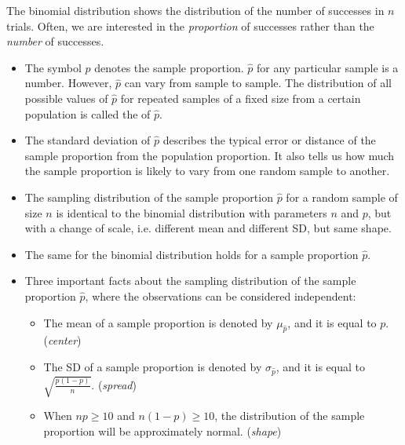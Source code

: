 \noindent The binomial distribution shows the distribution of the number of successes in $n$ trials.  Often, we are interested in the \textit{proportion} of successes rather than the \textit{number} of successes.
\begin{itemize}

\item The symbol $\hat{p}$ denotes the sample proportion.  $\hat{p}$ for any particular sample is a number.  However, $\hat{p}$ can vary from sample to sample.  The distribution of all possible values of $\hat{p}$ for repeated samples of a fixed size from a certain population is called the  of $\hat{p}$.

\item The standard deviation of $\hat{p}$ describes the typical error or distance of the sample proportion from the population proportion.  It also tells us how much the sample proportion is likely to vary from one random sample to another.  

\item The sampling distribution of the sample proportion $\hat{p}$ for a random sample of size $n$ is identical to the binomial distribution with parameters $n$ and $p$, but with a change of scale, i.e. different mean and different SD, but same shape.

\item The same  for the binomial distribution holds for a sample proportion $\hat{p}$.

\item Three important facts about the sampling distribution of the sample proportion $\hat{p}$, where the observations can be considered independent:
\begin{itemize}\vspace{-1mm}
\item The mean of a sample proportion is denoted by $\mu_{\hat{p}}$, and it is equal to $p$.  (\textit{center})
\item The SD of a sample proportion is denoted by $\sigma_{\hat{p}}$, and it is equal to $\sqrt{\frac{p(1-p)}{n}}$.  (\textit{spread})
\item When $np\ge 10$ and $n(1-p)\ge 10$, the distribution of the sample proportion will be approximately normal.   (\textit{shape})
\end{itemize}


\end{itemize}
